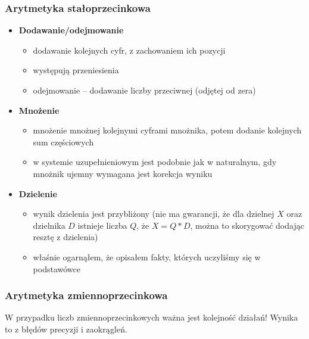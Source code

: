 \subsubsection{Arytmetyka stałoprzecinkowa}
\begin{itemize}
	\setlength\itemsep{1pt}
	\item \textbf{Dodawanie/odejmowanie}
	\begin{itemize}
		\setlength\itemsep{1pt}
		\item dodawanie kolejnych cyfr, z zachowaniem ich pozycji
		\item występują przeniesienia
		\item odejmowanie -- dodawanie liczby przeciwnej (odjętej od zera)
	\end{itemize}
	\item \textbf{Mnożenie}
	\begin{itemize}
		\setlength\itemsep{1pt}
		\item mnożenie mnożnej kolejnymi cyframi mnożnika, potem dodanie kolejnych sum częściowych
		\item w systemie uzupełnieniowym jest podobnie jak w naturalnym, gdy mnożnik ujemny wymagana jest korekcja wyniku
	\end{itemize}
	\item \textbf{Dzielenie}
	\begin{itemize}
		\setlength\itemsep{1pt}
		\item wynik dzielenia jest przybliżony (nie ma gwarancji, że dla dzielnej $X$ oraz dzielnika $D$ istnieje liczba $Q$, że $X = Q * D$, można to skorygować dodając resztę z dzielenia)
		\item właśnie ogarnąłem, że opisałem fakty, których uczyliśmy się w podstawówce
	\end{itemize}
\end{itemize}

\subsubsection{Arytmetyka zmiennoprzecinkowa}
W przypadku liczb zmiennoprzecinkowych ważna jest kolejność działań!
Wynika to z błędów precyzji i zaokrągleń.

